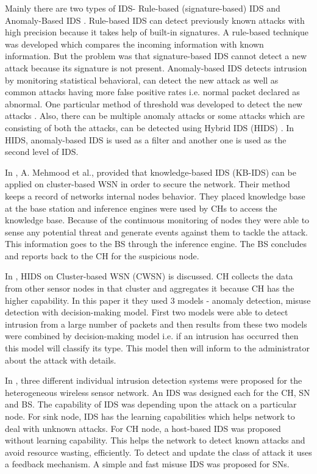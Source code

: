 \noindent
Mainly there are two types of IDS- Rule-based (signature-based) IDS and Anomaly-Based IDS \cite{khan2010framework}. Rule-based IDS can detect previously known attacks with high precision because it takes help of built-in signatures. A rule-based technique was developed \cite{jha2002building} which compares the incoming information with known information. But the problem was that signature-based IDS cannot detect a new attack because its signature is not present. Anomaly-based IDS detects intrusion by monitoring statistical behavioral, can detect the new attack as well as common attacks having more false positive rates i.e. normal packet declared as abnormal. One particular method of threshold was developed to detect the new attacks \cite{xie2011anomaly}. Also, there can be multiple anomaly attacks or some attacks which are consisting of both the attacks, can be detected using Hybrid IDS (HIDS) \cite{sedjelmaci2011novel}. In HIDS, anomaly-based IDS is used as a filter and another one is used as the second level of IDS.
\par
In \cite{mehmood2018secure}, A. Mehmood et al., provided that knowledge-based IDS (KB-IDS) can be applied on cluster-based WSN in order to secure the network. Their method keeps a record of networks internal nodes behavior. They placed knowledge base at the base station and inference engines were used by CHs to access the knowledge base. Because of the continuous monitoring of nodes they were able to sense any potential threat and generate events against them to tackle the attack. This information goes to the BS through the inference engine. The BS concludes and reports back to the CH for the suspicious node.
\par
In \cite{yan2009hybrid}, HIDS on Cluster-based WSN (CWSN) is discussed. CH collects the data from other sensor nodes in that cluster and aggregates it because CH has the higher capability. In this paper it they used 3 models - anomaly detection, misuse detection with decision-making model. First two models were able to detect intrusion from a large number of packets and then results from these two models were combined by decision-making model i.e. if an intrusion has occurred then this model will classify its type. This model then will inform to the administrator about the attack with details.
\par
In \cite{wang2011integrated}, three different individual intrusion detection systems were proposed for the heterogeneous wireless sensor network. An IDS was designed each for the CH, SN and BS. The capability of IDS was depending upon the attack on a particular node. For sink node, IDS has the learning capabilities which helps network to deal with unknown attacks. For CH node, a host-based IDS was proposed without learning capability. This helps the network to detect known attacks and avoid resource wasting, efficiently. To detect and update the class of attack it uses a feedback mechanism. A simple and fast misuse IDS was proposed for SNs.
